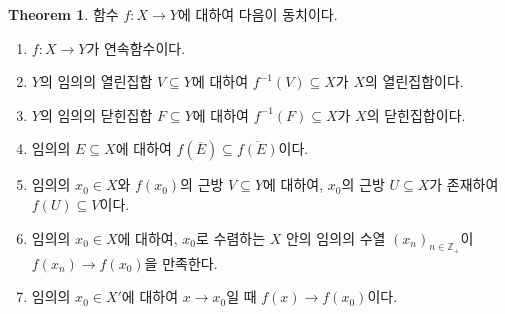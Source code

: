 \documentclass[11pt]{book}
\numberwithin{equation}{chapter}
\def\ZZ{\mathbb{Z}}
\theoremstyle{definition}
\newtheorem{thm}{Theorem}[section]
\newenvironment{enum}
	{\begin{enumerate}[label=(\alph*), leftmargin=2\parindent]}
	{\end{enumerate}}
\begin{document}
\begin{thm}
    함수 \(f : X \to Y\)에 대하여 다음이 동치이다.
    \begin{enum}
        \item \(f : X \to Y\)가 연속함수이다.
        \item \(Y\)의 임의의 열린집합 \(V \subseteq Y\)에 대하여 \(f^{-1}(V) \subseteq X\)가 \(X\)의 열린집합이다.
        \item \(Y\)의 임의의 닫힌집합 \(F \subseteq Y\)에 대하여 \(f^{-1}(F) \subseteq X\)가 \(X\)의 닫힌집합이다.
        \item 임의의 \(E \subseteq X\)에 대하여 \(f(\overline{E}) \subseteq \overline{f(E)}\)이다.
        \item 임의의 \(x_0 \in X\)와 \(f(x_0)\)의 근방 \(V \subseteq Y\)에 대하여, \(x_0\)의 근방 \(U \subseteq X\)가 존재하여 \(f(U) \subseteq V\)이다.
        \item 임의의 \(x_0 \in X\)에 대하여, \(x_0\)로 수렴하는 \(X\) 안의 임의의 수열 \((x_n)_{n \in \ZZ_+}\)이 \(f(x_n) \to f(x_0)\)을 만족한다.
        \item 임의의 \(x_0 \in X'\)에 대하여 \(x \to x_0\)일 때 \(f(x) \to f(x_0)\)이다.
    \end{enum}
\end{thm}
\end{document}
